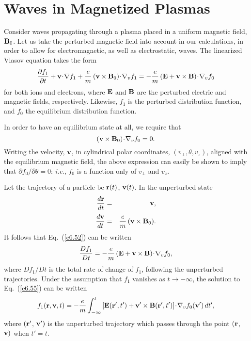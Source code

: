 \section{Waves in  Magnetized Plasmas}\label{s6.6}
Consider  waves propagating through a plasma placed in a uniform magnetic field, ${\bf B}_0$. 
Let us take the perturbed magnetic field into account in our
calculations, in order to allow for
electromagnetic, as well as electrostatic, waves. The linearized Vlasov equation
takes the form
\begin{equation}\label{e6.52}
\frac{\partial f_1}{\partial t} + {\bf v}\!\cdot\!\nabla f_1 + 
\frac{e}{m}\,({\bf v}\times{\bf B}_0)\!\cdot\!\nabla_v f_1 = -\frac{e}{m}\,
({\bf E} + {\bf v}\times{\bf B})\!\cdot\!\nabla_v f_0
\end{equation}
for both ions and electrons, where   ${\bf E}$ and
${\bf B}$ are the perturbed electric and magnetic fields, respectively. Likewise,
$f_1$ is the perturbed distribution function, and $f_0$  the equilibrium
distribution function.

In order to have an equilibrium state at all, we require that
\begin{equation}
({\bf v}\times{\bf B}_0)\!\cdot\!\nabla_v f_0 = 0.
\end{equation}
Writing the velocity, ${\bf v}$, in cylindrical polar coordinates,
$(v_\perp, \theta, v_z)$, aligned with the equilibrium magnetic
field, the above expression can easily be shown to imply that
$\partial f_0/\partial \theta =0$: {\em i.e.}, $f_0$ is a function
only of $v_\perp$ and $v_z$. 

Let the trajectory of a particle be ${\bf r}(t)$, ${\bf v}(t)$. In the
unperturbed state
\begin{eqnarray}
\frac{d{\bf r}}{dt} &=& {\bf v},\\[0.5ex]
\frac{d{\bf v}}{dt} &=& \frac{e}{m}\,({\bf v}\times{\bf B}_0).
\end{eqnarray}
It follows that Eq.~(\ref{e6.52}) can be written
\begin{equation}\label{e6.55}
\frac{D f_1}{Dt} = -\frac{e}{m}\,
({\bf E} + {\bf v}\times{\bf B})\!\cdot\!\nabla_v f_0,
\end{equation}
where $D f_1/Dt$ is the total rate of change of $f_1$, following the
unperturbed trajectories. Under the assumption that $f_1$ vanishes as
$t\rightarrow -\infty$, the solution to Eq.~(\ref{e6.55}) can be written
\begin{equation}\label{e6.56}
f_1({\bf r}, {\bf v}, t) =-\frac{e}{m}\int_{-\infty}^t
\left[{\bf E}({\bf r}', t') + {\bf v}'\times {\bf B}({\bf r}', t')\right]\!
\cdot\!\nabla_v f_0({\bf v}')\,dt',
\end{equation}
where $({\bf r}'$, ${\bf v}')$ is the unperturbed trajectory which passes
through the point $({\bf r}$, ${\bf v})$ when $t'=t$. 

